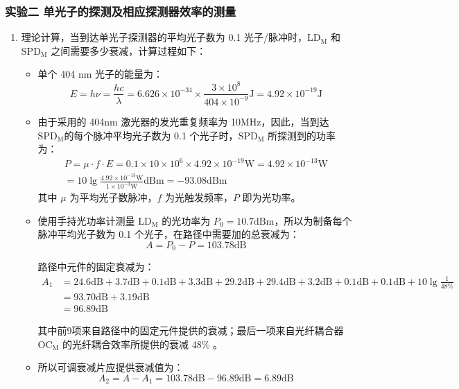 \documentclass[dvipsnames, svgnames,a4paper,11pt]{article}
\begin{document}
	\subsubsection{实验二 \quad 单光子的探测及相应探测器效率的测量}

		\begin{enumerate}
			\item 理论计算，当到达单光子探测器的平均光子数为 0.1 光子/脉冲时，$\mathrm{LD_M}$ 和 $\mathrm{SPD_M}$ 之间需要多少衰减，计算过程如下：
				\begin{itemize}
					\item 单个 404 nm 光子的能量为：
						$$ E = h \nu = \frac{h c}{\lambda} = 6.626 \times 10^{-34} \times \frac{3 \times 10^{8}}{404 \times 10^{-9}} \mathrm{J} = 4.92 \times 10^{-19} \mathrm{J} $$

					\item 由于采用的 404nm 激光器的发光重复频率为 10MHz，因此，当到达$\mathrm{SPD_M}$的每个脉冲平均光子数为 0.1 个光子时，$\mathrm{SPD_M}$ 所探测到的功率为：
						\begin{align*}
							P = \mu \cdot f \cdot E = 0.1 \times 10 \times 10^{6} \times 4.92 \times 10^{-19} \mathrm{W} = 4.92 \times 10^{-13} \mathrm{W}	\\
							= 10 \lg \frac{4.92 \times 10^{-13} \mathrm{W}}{1 \times 10^{-3} \mathrm{W}} \mathrm{dBm} = -93.08 \mathrm{dBm}
						\end{align*}
					其中 $\mu$ 为平均光子数脉冲，$f$ 为光触发频率，$P$ 即为光功率。

					\item 使用手持光功率计测量 $\mathrm{LD_M}$ 的光功率为 $P_0 = 10.7 \mathrm{dBm}$，所以为制备每个脉冲平均光子数为 0.1 个光子，在路径中需要加的总衰减为：
						$$ A = P_0 - P = 103.78 \mathrm{dB} $$
						
						路径中元件的固定衰减为：
						\begin{align*}
							A_1 &= 24.6 \mathrm{dB} + 3.7 \mathrm{dB} + 0.1 \mathrm{dB} + 3.3 \mathrm{dB} + 29.2 \mathrm{dB} + 29.4 \mathrm{dB} + 3.2 \mathrm{dB} + 0.1 \mathrm{dB} + 0.1 \mathrm{dB} + 10 \lg \frac{1}{48\%} \\
							&= 93.70 \mathrm{dB} + 3.19 \mathrm{dB} \\
							&= 96.89 \mathrm{dB}
						\end{align*}

						其中前9项来自路径中的固定元件提供的衰减；最后一项来自光纤耦合器 $\mathrm{OC_M}$ 的光纤耦合效率所提供的衰减 48\% 。

					\item 所以可调衰减片应提供衰减值为：
						$$ A_2 = A - A_1 = 103.78 \mathrm{dB} - 96.89 \mathrm{dB} = 6.89 \mathrm{dB} $$


\end{itemize}
\end{enumerate}
\end{document}
